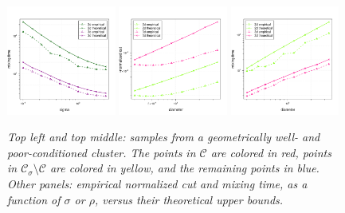 \documentclass[11pt,twoside]{article}
\newcommand{\1}{\mathbf{1}}
\newcommand{\Cset}{\mathcal{C}}
\newcommand{\Csig}{\Cset_{\sigma}}
\begin{document}
\begin{figure}[tb]
  \includegraphics[width=0.32\textwidth]{example1plots/sigma_mixing_time_plot}
  \includegraphics[width=0.32\textwidth]{example1plots/diameter_normalized_cut_plot}
  \includegraphics[width=0.32\textwidth]{example1plots/diameter_mixing_time_plot}
  \caption{\it\small Top left and top middle: samples from a geometrically
    well- and poor-conditioned cluster. The points in $\Cset$ are colored in 
    red, points in $\Csig \setminus \Cset$ are colored in yellow, and the
    remaining points in blue. Other panels: empirical normalized cut and mixing
    time, as a function of $\sigma$ or $\rho$, versus their theoretical upper
    bounds.} 
  \label{fig:fig1}
\end{figure}
\end{document}
